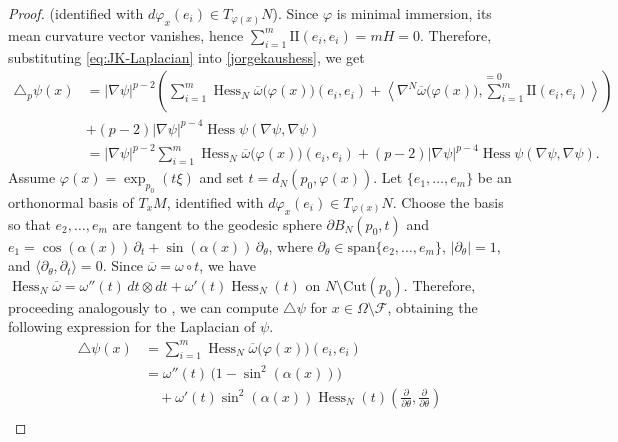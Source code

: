 \documentclass{article}
\begin{document}
\begin{proof}
(identified with $d\varphi_x(e_i)\in T_{\varphi(x)}N$). Since $\varphi$ is minimal immersion, its mean curvature vector vanishes, hence $\sum_{i=1}^m \mathrm{I}\mathrm{I}(e_i,e_i)=mH=0$.
Therefore, substituting \eqref{eq:JK-Laplacian} into \eqref{jorgekaushess}, we get 
\begin{equation}\label{JorgeKausp}
    \begin{aligned}
        \triangle_p \psi(x) &= |\nabla \psi|^{p-2} \left( \sum_{i=1}^m \operatorname{Hess}_N \overline{\omega}\big(\varphi(x)\big)(e_i,e_i) + \stackrel{=0}{\left\langle \nabla^N \overline{\omega}\big(\varphi(x)\big) , \sum_{i=1}^m \mathrm{I}\mathrm{I}(e_i,e_i)  \right\rangle}  \right)  \\ &+ (p-2)|\nabla \psi|^{p-4}\operatorname{Hess}\psi(\nabla \psi, \nabla \psi) \\
  &= |\nabla \psi|^{p-2} \sum_{i=1}^m \operatorname{Hess}_N \overline{\omega}\big(\varphi(x)\big)(e_i,e_i) + (p-2)|\nabla \psi|^{p-4}\operatorname{Hess}\psi(\nabla \psi, \nabla \psi). 
    \end{aligned}
\end{equation}
Assume $\varphi(x)=\exp_{p_0}(t\xi)$ and set $t=d_N(p_0,\varphi(x))$.
Let $\{e_1,\ldots,e_m\}$ be an orthonormal basis of $T_xM$, identified with $d\varphi_x(e_i)\in T_{\varphi(x)}N$. Choose the basis so that $e_2,\ldots,e_m$ are tangent to the geodesic sphere
$\partial B_N(p_0,t)$ and $e_1=\cos(\alpha(x))\,\partial_t+\sin(\alpha(x))\,\partial_\theta$,
where $\partial_\theta\in\mathrm{span}\{e_2,\ldots,e_m\}$, $|\partial_\theta|=1$, and
$\langle \partial_\theta,\partial_t\rangle=0$.
Since $\overline{\omega}=\omega\circ t$, we have $\operatorname{Hess}_N\overline{\omega}=\omega''(t)\,dt\otimes dt+\omega'(t)\operatorname{Hess}_N(t)$ on $N\setminus \mathrm{Cut}(p_0)$. Therefore, proceeding analogously to \cite[p. 12]{BessaMontenegro}, we can compute $\triangle\psi$ for $x\in\Omega\setminus\mathcal F$, obtaining the following expression for the Laplacian of $\psi$.
\begin{equation}\label{Laplacianoimersão}
\begin{aligned}
\triangle \psi(x)
&= \sum_{i=1}^m  \operatorname{Hess}_N \overline{\omega}\big(\varphi(x)\big)(e_i,e_i) \\
&= \omega''(t)\,\bigl(1 - \sin^2 \left( \alpha(x) \right) \bigr) \\
&\quad + \omega'(t) \sin^2 \left( \alpha(x) \right)
   \operatorname{Hess}_N(t)\!\left(\frac{\partial}{\partial\theta},
   \frac{\partial}{\partial\theta}\right) \\

\end{aligned}
\end{equation}
\end{proof}
\end{document}
